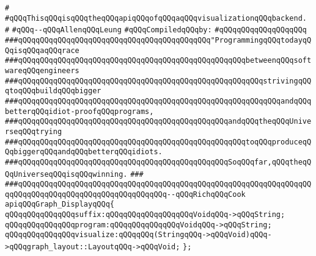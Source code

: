 \label{src/lib/compiler/back/low/display/graph-display.api}
\verb|#|\newline
\verb|#qQQqThisqQQqisqQQqtheqQQqapiqQQqofqQQqaqQQqvisualizationqQQqbackend.|\newline
\verb|#|\newline
\verb|#qQQq--qQQqAllenqQQqLeung|\newline
\newline
\verb|#qQQqCompiledqQQqby:|\newline
\verb|#qQQqqQQqqQQqqQQqqQQq|\newline
\newline
\verb|###qQQqqQQqqQQqqQQqqQQqqQQqqQQqqQQqqQQqqQQqqQQq"ProgrammingqQQqtodayqQQqisqQQqaqQQqrace|\newline
\verb|###qQQqqQQqqQQqqQQqqQQqqQQqqQQqqQQqqQQqqQQqqQQqqQQqqQQqbetweenqQQqsoftwareqQQqengineers|\newline
\verb|###qQQqqQQqqQQqqQQqqQQqqQQqqQQqqQQqqQQqqQQqqQQqqQQqqQQqqQQqstrivingqQQqtoqQQqbuildqQQqbigger|\newline
\verb|###qQQqqQQqqQQqqQQqqQQqqQQqqQQqqQQqqQQqqQQqqQQqqQQqqQQqqQQqqQQqandqQQqbetterqQQqidiot-proofqQQqprograms,|\newline
\verb|###qQQqqQQqqQQqqQQqqQQqqQQqqQQqqQQqqQQqqQQqqQQqqQQqandqQQqtheqQQqUniverseqQQqtrying|\newline
\verb|###qQQqqQQqqQQqqQQqqQQqqQQqqQQqqQQqqQQqqQQqqQQqqQQqqQQqtoqQQqproduceqQQqbiggerqQQqandqQQqbetterqQQqidiots.|\newline
\verb|###qQQqqQQqqQQqqQQqqQQqqQQqqQQqqQQqqQQqqQQqqQQqqQQqSoqQQqfar,qQQqtheqQQqUniverseqQQqisqQQqwinning.|\newline
\verb|###|\newline
\verb|###qQQqqQQqqQQqqQQqqQQqqQQqqQQqqQQqqQQqqQQqqQQqqQQqqQQqqQQqqQQqqQQqqQQqqQQqqQQqqQQqqQQqqQQqqQQqqQQqqQQqqQQq--qQQqRichqQQqCook|\newline
\newline
\newline
\newline
\verb|apiqQQqGraph_DisplayqQQq{|\newline
\newline
\verb|qQQqqQQqqQQqqQQqsuffix:qQQqqQQqqQQqqQQqqQQqVoidqQQq->qQQqString;|\newline
\verb|qQQqqQQqqQQqqQQqprogram:qQQqqQQqqQQqqQQqVoidqQQq->qQQqString;|\newline
\verb|qQQqqQQqqQQqqQQqvisualize:qQQqqQQq(StringqQQq->qQQqVoid)qQQq->qQQqgraph_layout::LayoutqQQq->qQQqVoid;|\newline
\newline
\verb|};|\newline
\newline

